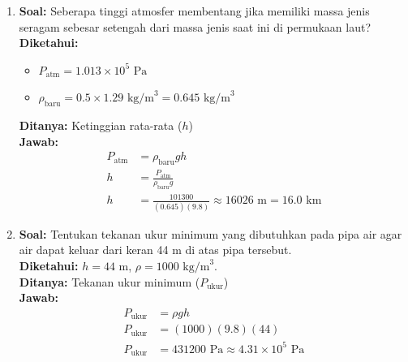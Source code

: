 \documentclass[twocolumn]{article}
\begin{document}
\begin{enumerate}
    \item \textbf{Soal:} Seberapa tinggi atmosfer membentang jika memiliki massa jenis seragam sebesar setengah dari massa jenis saat ini di permukaan laut? \\
    \textbf{Diketahui:} 
    \begin{itemize}
        \item $P_{\text{atm}} = 1.013 \times 10^5 \text{ Pa}$
        \item $\rho_{\text{baru}} = 0.5 \times 1.29 \text{ kg/m}^3 = 0.645 \text{ kg/m}^3$
    \end{itemize}
    \textbf{Ditanya:} Ketinggian rata-rata ($h$) \\
    \textbf{Jawab:}
    \begin{align*}
        P_{\text{atm}} &= \rho_{\text{baru}} g h \\
        h &= \frac{P_{\text{atm}}}{\rho_{\text{baru}} g} \\
        h &= \frac{101300}{(0.645)(9.8)} \approx 16026 \text{ m} = 16.0 \text{ km}
    \end{align*}

    \item \textbf{Soal:} Tentukan tekanan ukur minimum yang dibutuhkan pada pipa air agar air dapat keluar dari keran 44 m di atas pipa tersebut. \\
    \textbf{Diketahui:} $h = 44 \text{ m}$, $\rho = 1000 \text{ kg/m}^3$. \\
    \textbf{Ditanya:} Tekanan ukur minimum ($P_{\text{ukur}}$) \\
    \textbf{Jawab:}
    \begin{align*}
        P_{\text{ukur}} &= \rho g h \\
        P_{\text{ukur}} &= (1000)(9.8)(44) \\
        P_{\text{ukur}} &= 431200 \text{ Pa} \approx 4.31 \times 10^5 \text{ Pa}
    \end{align*}


\end{enumerate}
\end{document}
